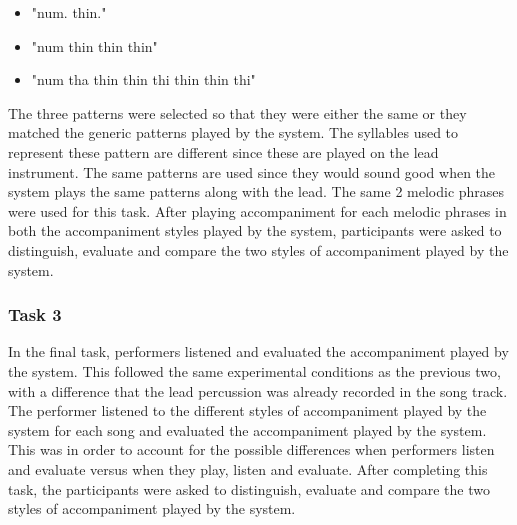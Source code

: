 \begin{itemize}
\item "num. thin."
\item "num thin thin thin"
\item "num tha thin thin thi thin thin thi"
\end{itemize}

The three patterns were selected so that they were either the same or they matched the generic patterns played by the system. The syllables used to represent these pattern are different since these are played on the lead instrument. The same patterns are used since they would sound good when the system plays the same patterns along with the lead. The same 2 melodic phrases were used for this task. After playing accompaniment for each melodic phrases in both the accompaniment styles played by the system, participants were asked to distinguish, evaluate and compare the two styles of accompaniment played by the system. 

\subsubsection{Task 3}

In the final task, performers listened and evaluated the accompaniment played by the system. This followed the same experimental conditions as the previous two, with a difference that the lead percussion was already recorded in the song track. The performer listened to the different styles of accompaniment played by the system for each song and evaluated the accompaniment played by the system. This was in order to account for the possible differences when performers listen and evaluate versus when they play, listen and evaluate. After completing this task, the participants were asked to distinguish, evaluate and compare the two styles of accompaniment played by the system. 




